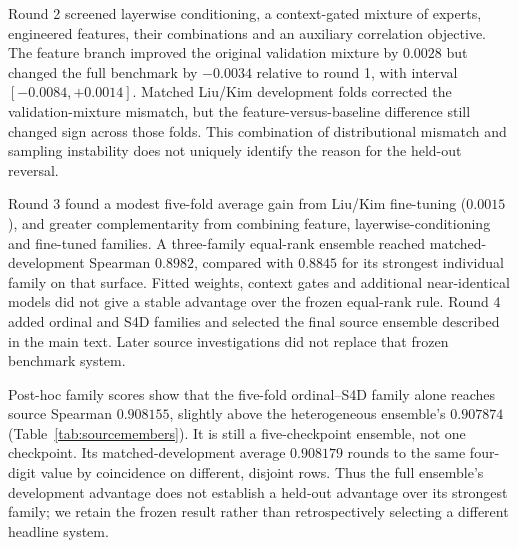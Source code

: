 Round 2 screened layerwise conditioning, a context-gated mixture of experts, engineered features, their combinations and an auxiliary correlation objective. The feature branch improved the original validation mixture by $0.0028$ but changed the full benchmark by $-0.0034$ relative to round 1, with interval $[-0.0084,+0.0014]$. Matched Liu/Kim development folds corrected the validation-mixture mismatch, but the feature-versus-baseline difference still changed sign across those folds. This combination of distributional mismatch and sampling instability does not uniquely identify the reason for the held-out reversal.

Round 3 found a modest five-fold average gain from Liu/Kim fine-tuning ($0.0015$), and greater complementarity from combining feature, layerwise-conditioning and fine-tuned families. A three-family equal-rank ensemble reached matched-development Spearman $0.8982$, compared with $0.8845$ for its strongest individual family on that surface. Fitted weights, context gates and additional near-identical models did not give a stable advantage over the frozen equal-rank rule. Round 4 added ordinal and S4D families and selected the final source ensemble described in the main text. Later source investigations did not replace that frozen benchmark system.

Post-hoc family scores show that the five-fold ordinal--S4D family alone reaches source Spearman $0.908155$, slightly above the heterogeneous ensemble's $0.907874$ (Table~\ref{tab:sourcemembers}). It is still a five-checkpoint ensemble, not one checkpoint. Its matched-development average $0.908179$ rounds to the same four-digit value by coincidence on different, disjoint rows. Thus the full ensemble's development advantage does not establish a held-out advantage over its strongest family; we retain the frozen result rather than retrospectively selecting a different headline system.



